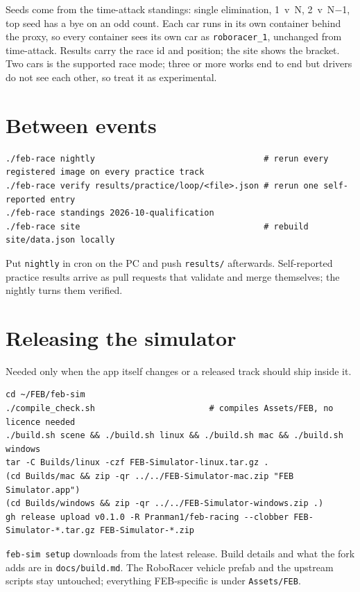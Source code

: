 \documentclass[11pt,a4paper]{article}
\newcommand{\file}[1]{\texttt{#1}}
\newcommand{\cmd}[1]{\texttt{#1}}
\begin{document}
Seeds come from the time-attack standings: single elimination, 1~v~N, 2~v~N$-$1, top seed
has a bye on an odd count. Each car runs in its own container behind the proxy, so every
container sees its own car as \texttt{roboracer\_1}, unchanged from time-attack. Results carry
the race id and position; the site shows the bracket. Two cars is the supported race mode;
three or more works end to end but drivers do not see each other, so treat it as experimental.

\section{Between events}

\begin{lstlisting}
./feb-race nightly                                  # rerun every registered image on every practice track
./feb-race verify results/practice/loop/<file>.json # rerun one self-reported entry
./feb-race standings 2026-10-qualification
./feb-race site                                     # rebuild site/data.json locally
\end{lstlisting}

Put \cmd{nightly} in cron on the PC and push \file{results/} afterwards. Self-reported practice
results arrive as pull requests that validate and merge themselves; the nightly turns them
verified.

\section{Releasing the simulator}

Needed only when the app itself changes or a released track should ship inside it.

\begin{lstlisting}
cd ~/FEB/feb-sim
./compile_check.sh                       # compiles Assets/FEB, no licence needed
./build.sh scene && ./build.sh linux && ./build.sh mac && ./build.sh windows
tar -C Builds/linux -czf FEB-Simulator-linux.tar.gz .
(cd Builds/mac && zip -qr ../../FEB-Simulator-mac.zip "FEB Simulator.app")
(cd Builds/windows && zip -qr ../../FEB-Simulator-windows.zip .)
gh release upload v0.1.0 -R Pranman1/feb-racing --clobber FEB-Simulator-*.tar.gz FEB-Simulator-*.zip
\end{lstlisting}

\cmd{feb-sim setup} downloads from the latest release. Build details and what the fork adds
are in \file{docs/build.md}. The RoboRacer vehicle prefab and the upstream scripts stay
untouched; everything FEB-specific is under \file{Assets/FEB}.
\end{document}
